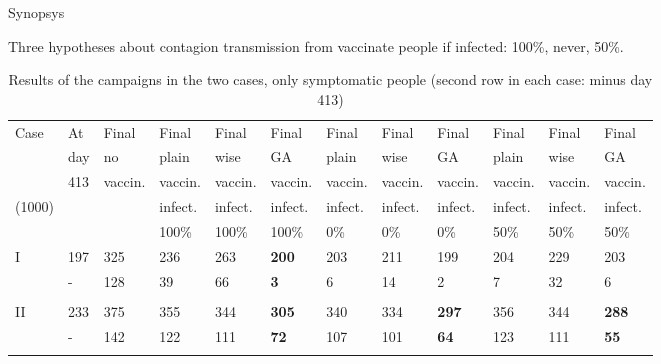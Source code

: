 \documentclass[8pt]{beamer}
\begin{document}
\begin{frame}{Synopsys}

Three hypotheses about contagion transmission from vaccinate people if infected: 100\%, never, 50\%.

\medskip

\begin{table}[H]
\centering
\begin{scriptsize} %
\begin{tabular}{llllllllllll}
\toprule
Case    & At   & Final      & Final        & Final       & Final      & Final       & Final    & Final        & Final    & Final        & Final     \\
             & day & no         & plain       & wise        & GA         & plain       & wise        & GA         & plain       & wise        & GA    \\
             & 413 & vaccin. & vaccin.    & vaccin.  & vaccin.  & vaccin.  & vaccin.  & vaccin.  & vaccin.  & vaccin.  & vaccin.  \\
 (1000) &        &              &  infect.  &  infect. &  infect. &  infect. &  infect. &  infect. &  infect. &  infect. &  infect.\\
             &       &              &  100\%   &  100\% &  100\% &  0\% &  0\% &  0\% & 50\% &  50\% &  50\% \\
\midrule
I            & 197 & 325 & 236 & 263 & \textbf{200} & 203 & 211   & 199 & 204 & 229 & 203 \\
             & -      & 128 & 39    & 66  & \textbf{3}    &  6     & 14  & 2     & 7     & 32 & 6 \\
\\
II           & 233 & 375 & 355 &  344 & \textbf{305}  & 340 & 334 & \textbf{297}  & 356 & 344 &  \textbf{288} \\
             & -      &  142 & 122 & 111 & \textbf{72}    & 107 & 101 & \textbf{64}   & 123   & 111 &  \textbf{55} \\
\\
\bottomrule  
\end{tabular}
\end{scriptsize}
\caption{Results of the campaigns in the two cases, only symptomatic people (second row in each case: minus day 413)}
\label{caseSynopsys}
\end{table}

\end{frame}
\end{document}
